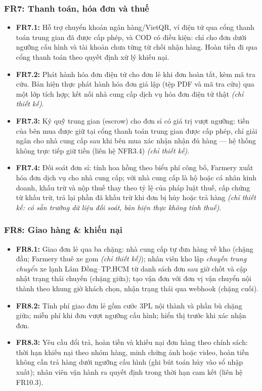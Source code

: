 \subsubsection*{FR7: Thanh toán, hóa đơn và thuế}
\begin{itemize}
    \item \textbf{FR7.1:} Hỗ trợ chuyển khoản ngân hàng/VietQR, ví điện tử
    qua cổng thanh toán trung gian đã được cấp phép, và COD có điều kiện: chỉ
    cho đơn dưới ngưỡng cấu hình và tài khoản chưa từng từ chối nhận hàng.
    Hoàn tiền đi qua cổng thanh toán theo quyết định xử lý khiếu nại.
    \item \textbf{FR7.2:} Phát hành hóa đơn điện tử cho đơn lẻ khi đơn hoàn
    tất, kèm mã tra cứu. Bản hiện thực phát hành hóa đơn giả lập (tệp PDF và mã
    tra cứu) qua một lớp tích hợp; kết nối nhà cung cấp dịch vụ hóa đơn điện
    tử thật \emph{(chỉ thiết kế)}.
    \item \textbf{FR7.3:} Ký quỹ trung gian (escrow) cho đơn sỉ có giá trị
    vượt ngưỡng: tiền của bên mua được giữ tại cổng thanh toán trung gian được
    cấp phép, chỉ giải ngân cho nhà cung cấp sau khi bên mua xác nhận nhận
    đủ hàng --- hệ thống không trực tiếp giữ tiền (liên hệ NFR3.4)
    \emph{(chỉ thiết kế)}.
    \item \textbf{FR7.4:} Đối soát đơn sỉ: tính hoa hồng theo biểu phí công
    bố, Farmery xuất hóa đơn dịch vụ cho nhà cung cấp; với nhà cung cấp là hộ
    hoặc cá nhân kinh doanh, khấu trừ và nộp thuế thay theo tỷ lệ của pháp
    luật thuế, cấp chứng từ khấu trừ, trả lại phần đã khấu trừ khi đơn bị hủy
    hoặc trả hàng \emph{(chỉ thiết kế: có sẵn trường dữ liệu đối soát, bản
    hiện thực không tính thuế)}.
\end{itemize}

\subsubsection*{FR8: Giao hàng \& khiếu nại}
\begin{itemize}
    \item \textbf{FR8.1:} Giao đơn lẻ qua ba chặng: nhà cung cấp tự đưa
    hàng về kho (chặng đầu; Farmery thuê xe gom \emph{(chỉ thiết kế)}); nhân
    viên kho lập \emph{chuyến trung chuyển} xe lạnh Lâm Đồng--TP.HCM từ danh
    sách đơn sau giờ chốt và cập nhật trạng thái chuyến (chặng giữa); tạo vận
    đơn với đơn vị vận chuyển nội thành theo khung giờ khách chọn, nhận trạng
    thái qua webhook (chặng cuối).
    \item \textbf{FR8.2:} Tính phí giao đơn lẻ gồm cước 3PL nội thành và phần
    bù chặng giữa; miễn phí khi đơn vượt ngưỡng cấu hình; hiển thị trước khi
    xác nhận đơn.
    \item \textbf{FR8.3:} Yêu cầu đổi trả, hoàn tiền và khiếu nại đơn hàng
    theo chính sách: thời hạn khiếu nại theo nhóm hàng, minh chứng ảnh hoặc
    video, hoàn tiền không cần trả hàng dưới ngưỡng cấu hình (ghi bút toán hủy
    vào sổ nhập xuất); nhân viên vận hành ra quyết định trong thời hạn cam kết
    (liên hệ FR10.3).
\end{itemize}

